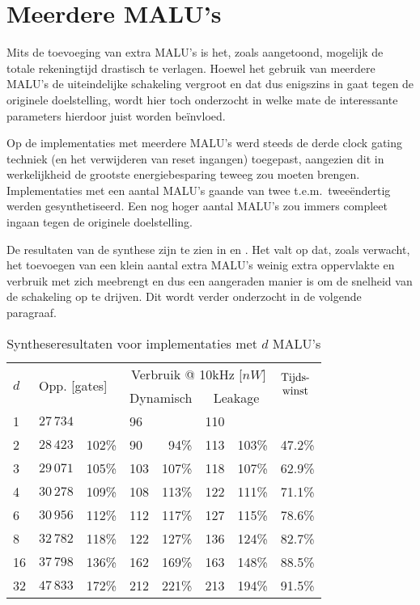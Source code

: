 \section{Meerdere MALU's\label{sectie-resulaten-MALU's}}

Mits de toevoeging van extra MALU's is het, zoals aangetoond, mogelijk de totale rekeningtijd drastisch te verlagen. Hoewel het gebruik van meerdere MALU's de uiteindelijke schakeling vergroot en dat dus enigszins in gaat tegen de originele doelstelling, wordt hier toch onderzocht in welke mate de interessante parameters hierdoor juist worden be\"invloed.

Op de implementaties met meerdere MALU's werd steeds de derde clock gating techniek (en het verwijderen van reset ingangen) toegepast, aangezien dit in werkelijkheid de grootste energiebesparing teweeg zou moeten brengen. Implementaties met een aantal MALU's gaande van twee t.e.m.\ twee\"endertig werden gesynthetiseerd. Een nog hoger aantal MALU's zou immers compleet ingaan tegen de originele doelstelling.

De resultaten van de synthese zijn te zien in  en . Het valt op dat, zoals verwacht, het toevoegen van een klein aantal extra MALU's weinig extra oppervlakte en verbruik met zich meebrengt en dus een aangeraden manier is om de snelheid van de schakeling op te drijven. Dit wordt verder onderzocht in de volgende paragraaf.

\begin{table}[h]
	\caption{Syntheseresultaten voor implementaties met $d$ MALU's}
	\label{tabel-resultaten-md}

	\centering
	\begin{tabular}{llrlrlrl}
		\toprule
		\multirow{2}{*}{$d$} & \multicolumn{2}{l}{\multirow{2}{*}{Opp. [gates]}}	& \multicolumn{4}{c}{Verbruik @ 10kHz [$nW$]}	& \multirow{2}{*}{$\begin{array}{@{}c@{}}\text{Tijds-}\\\text{winst}\end{array}$}\\
		\cmidrule{4-7}
		&	& & \multicolumn{2}{c}{Dynamisch}	& \multicolumn{2}{c}{Leakage}	&\\
		\midrule
		1			& $27\,734$	& 			& 96	& 			& 110	& 			& \\
		2			& $28\,423$	& 102\%	& 90	& 94\%	& 113	& 103\%	& 47.2\%\\
		3			& $29\,071$	& 105\%	& 103	& 107\%	& 118	& 107\%	& 62.9\%\\
		4			& $30\,278$	& 109\%	& 108	& 113\%	& 122	& 111\%	& 71.1\%\\
		6			& $30\,956$	& 112\%	& 112	& 117\%	& 127	& 115\%	& 78.6\%\\
		8			& $32\,782$	& 118\%	& 122	& 127\%	& 136	& 124\%	& 82.7\%\\
		16			& $37\,798$	& 136\%	& 162	& 169\%	& 163	& 148\%	& 88.5\%\\
		32			& $47\,833$	& 172\%	& 212	& 221\%	& 213	& 194\%	& 91.5\%\\
		\hline		
	\end{tabular}
\end{table}


